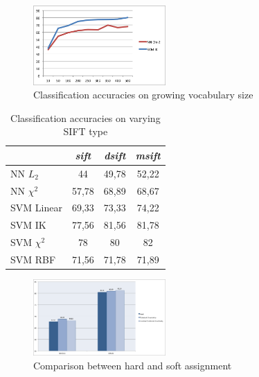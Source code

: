 \begin{figure}[h]
\begin{center}
\includegraphics[width=0.45\textwidth]{images/vocabulary.png}
\end{center}
  \caption{Classification accuracies on growing vocabulary size}
\label{fig:vocabulary}
\end{figure}

\begin{table}[h]
\begin{center}
\begin{tabular}{|l|c|c|c|}
\hline
 & \emph{sift} & \emph{dsift} & \emph{msift}\\
\hline\hline
NN $L_2$ & 44 & 49,78 & 52,22\\
NN $\chi^2$ & 57,78 & 68,89 & 68,67\\
SVM Linear & 69,33 & 73,33 & 74,22\\
SVM IK & 77,56 & 81,56 & 81,78\\
SVM $\chi^2$ & 78 & 80 & 82\\
SVM RBF & 71,56 & 71,78 & 71,89 \\
\hline
\end{tabular}
\end{center}
\label{tab:sifttype}
\caption{Classification accuracies on varying SIFT type}
\end{table}

\begin{figure}[h]
\begin{center}
\includegraphics[width=0.45\textwidth]{images/soft-comparison.png}
\end{center}
  \caption{Comparison between hard and soft assignment}
\label{fig:vocabulary}
\end{figure}




